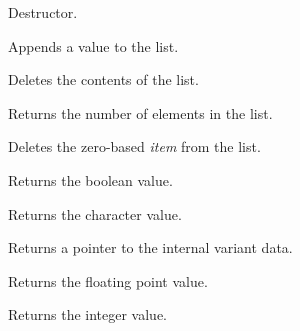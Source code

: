 
Destructor.

\label{wxvariantappend}


Appends a value to the list.

\label{wxvariantclearlist}


Deletes the contents of the list.

\label{wxvariantgetcount}


Returns the number of elements in the list.

\label{wxvariantdelete}


Deletes the zero-based {\it item} from the list.

\label{wxvariantgetbool}


Returns the boolean value.

\label{wxvariantgetchar}


Returns the character value.

\label{wxvariantgetdata}


Returns a pointer to the internal variant data.

\label{wxvariantgetdouble}


Returns the floating point value.

\label{wxvariantgetlong}


Returns the integer value.

\label{wxvariantgetname}


